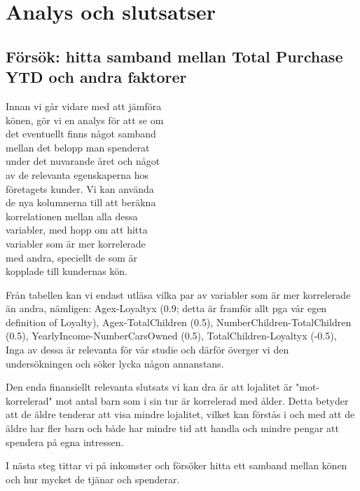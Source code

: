 \documentclass[]{article}
\begin{document}
\section{Analys och slutsatser}

\subsection{Försök: hitta samband mellan Total Purchase YTD och andra faktorer}

Innan vi går vidare med att jämföra \\
könen, gör vi en analys för att se om \\
det eventuellt finns något samband \\
mellan det belopp man spenderat \\
under det nuvarande året och något \\
av de relevanta egenskaperna hos \\
företagets kunder. Vi kan använda \\
de nya kolumnerna till att beräkna \\
korrelationen mellan alla dessa \\
variabler, med hopp om att hitta \\
variabler som är mer korrelerade \\
med andra, speciellt de som är \\
kopplade till kundernas kön.

Från tabellen kan vi endast utläsa vilka par av variabler som är mer korrelerade än andra, nämligen: Agex-Loyaltyx (0.9; detta är framför allt pga vår egen definition of Loyalty), Agex-TotalChildren (0.5), NumberChildren-TotalChildren (0.5), YearlyIncome-NumberCarsOwned (0.5), TotalChildren-Loyaltyx (-0.5), Inga av dessa är relevanta för vår studie och därför överger vi den undersökningen och söker lycka någon annanstans.

Den enda finansiellt relevanta slutsats vi kan dra är att lojalitet är "mot-korrelerad" mot antal barn som i sin tur är korrelerad med ålder. Detta betyder att de äldre tenderar att visa mindre lojalitet, vilket kan förstås i och med att de äldre har fler barn och både har mindre tid att handla och mindre pengar att spendera på egna intressen.

I nästa steg tittar vi på inkomster och försöker hitta ett samband mellan könen och hur mycket de tjänar och spenderar.
\end{document}
